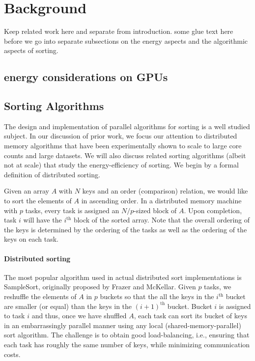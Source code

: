 \section{Background}
Keep related work here and separate from introduction. some glue text here before we go into separate subsections on the energy aspects and the algorithmic aspects of sorting.

\subsection{energy considerations on GPUs}

\subsection{Sorting Algorithms}
The design and implementation of parallel algorithms for sorting is a well studied subject. In our discussion of prior work, we focus our attention to distributed memory algorithms that have been experimentally shown to scale to large core counts and large datasets. We will also discuss related sorting algorithms (albeit not at scale) that study the energy-efficiency of sorting. We begin by a formal definition of distributed sorting.


Given an array $A$ with $N$ keys and an order (comparison) relation, we would like to sort the elements of $A$ in ascending order. In a distributed memory machine with $p$ tasks, every task is assigned an $N/p$-sized block of $A$. Upon completion, task $i$ will have the $i^{\text{th}}$ block of the sorted array. Note that the overall ordering of the keys is determined by the ordering of the tasks as well as the ordering of the keys on each task.  

\paragraph{Distributed sorting}

The most popular algorithm used in actual distributed
sort implementations is SampleSort, originally proposed by Frazer and McKellar\cite{samplesort}. Given $p$ tasks, we
reshuffle the elements of $A$ in $p$ buckets so that the all the
keys in the $i^\text{th}$ bucket are smaller (or equal) than the keys in
the $(i+1)^\text{th}$ bucket. Bucket $i$ is assigned to task $i$ and thus,
once we have shuffled $A$, each task can sort its bucket of
keys in an embarrassingly parallel manner using any local
(shared-memory-parallel) sort algorithm. The challenge is to obtain good load-balancing, i.e., ensuring that each 
task  has roughly the same number of keys, while minimizing communication costs.  

